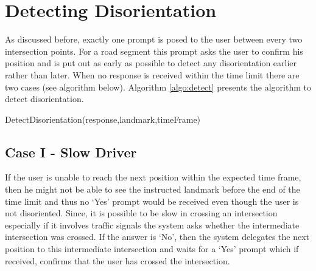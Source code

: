 \documentclass{iitkthesis}
\begin{document}
\section{Detecting Disorientation}
As discussed before, exactly one prompt is posed to the user between 
every two intersection points. For a road segment this prompt asks the 
user to confirm his position and is put out as early as possible 
to detect any disorientation earlier rather than later. When no response
is received within the time limit there are two cases (see 
algorithm below).  Algorithm \ref{algo:detect} presents the algorithm to 
detect disorientation.

\begin{algorithm}[H]
\label{algo:detect}
\SetVline
\dontprintsemicolon
{}
\BlankLine

\caption{DetectDisorientation(response,landmark,timeFrame)}
\end{algorithm}
\subsection*{Case I - Slow Driver}
If the user is unable to reach the next position within the expected time 
frame, then he might not be able to see the instructed landmark before 
the end of the time limit and thus no `Yes' prompt would be received even 
though the user is not disoriented. Since, it is  possible to be 
slow in crossing an intersection especially if it involves traffic 
signals the system asks whether 
the intermediate intersection was crossed. If the answer is `No', then 
the system delegates the next position to this intermediate intersection 
and waits for a `Yes' prompt which if received, confirms that the user 
has crossed the intersection. 
\end{document}
